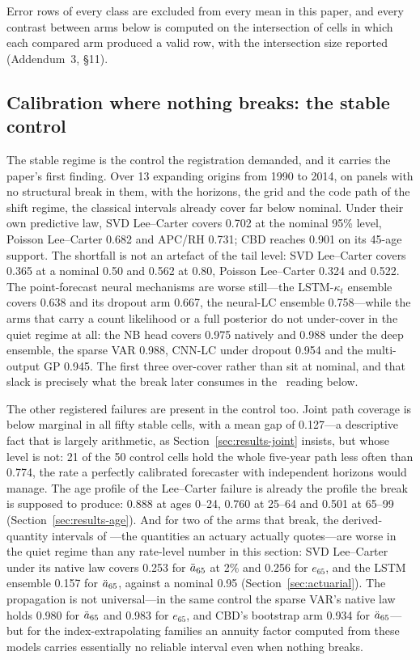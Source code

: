 Error rows of every class are excluded from every mean in this paper, and
every contrast between arms below is computed on the intersection of cells
in which each compared arm produced a valid row, with the intersection
size reported (Addendum~3, \S11).

\subsection{Calibration where nothing breaks: the stable control}
\label{sec:results-stable}

The stable regime is the control the registration demanded, and it carries
the paper's first finding. Over 13 expanding origins from 1990 to 2014, on
panels with no structural break in them, with the horizons, the grid and
the code path of the shift regime, the classical intervals already cover
far below nominal. Under their own predictive law, SVD Lee--Carter covers
0.702 at the nominal 95\% level, Poisson Lee--Carter 0.682 and APC/RH
0.731; CBD reaches 0.901 on its 45-age support. The shortfall is not an
artefact of the tail level: SVD Lee--Carter covers 0.365 at a nominal 0.50
and 0.562 at 0.80, Poisson Lee--Carter 0.324 and 0.522. The point-forecast
neural mechanisms are worse still---the LSTM-$\kappa_t$ ensemble covers
0.638 and its dropout arm 0.667, the neural-LC ensemble 0.758---while the
arms that carry a count likelihood or a full posterior do not under-cover
in the quiet regime at all: the NB head covers 0.975 natively and 0.988
under the deep ensemble, the sparse VAR 0.988, CNN-LC under dropout 0.954
and the multi-output GP 0.945. The first three over-cover rather than sit
at nominal, and that slack is precisely what the break later consumes in
the \Htwo\ reading below.

The other registered failures are present in the control too. Joint path
coverage is below marginal in all fifty stable cells, with a mean gap of
0.127---a descriptive fact that is largely arithmetic, as
Section~\ref{sec:results-joint} insists, but whose level is not: 21 of the
50 control cells hold the whole five-year path less often than 0.774, the
rate a perfectly calibrated forecaster with independent horizons would
manage. The age profile of the Lee--Carter failure is already the profile
the break is supposed to produce: 0.888 at ages 0--24, 0.760 at 25--64 and
0.501 at 65--99 (Section~\ref{sec:results-age}). And for two of the arms that
break, the derived-quantity intervals of \Hfive---the quantities an
actuary actually quotes---are worse in the quiet regime than any
rate-level number in this section: SVD Lee--Carter under its native
law covers 0.253 for $\ddot{a}_{65}$ at 2\% and 0.256 for $e_{65}$, and the
LSTM ensemble 0.157 for $\ddot{a}_{65}$, against a nominal 0.95
(Section~\ref{sec:actuarial}). The propagation is not universal---in the
same control the sparse VAR's native law holds 0.980 for $\ddot{a}_{65}$ and
0.983 for $e_{65}$, and CBD's bootstrap arm 0.934 for $\ddot{a}_{65}$---but for
the index-extrapolating families an annuity factor computed from these
models carries essentially no reliable interval even when nothing breaks.

